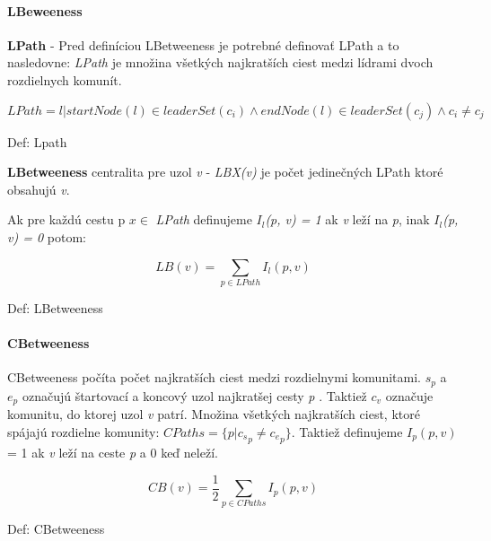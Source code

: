 \documentclass[slovak,master,public,dept460,male,cpdeclaration,oneside]{diploma}
\begin{document}
\paragraph{LBeweeness}
\hfill \break
\textbf{LPath} - Pred definíciou LBetweeness je potrebné definovať LPath a to nasledovne: \textit{LPath} je množina všetkých najkratších ciest medzi lídrami dvoch rozdielnych komunít. 


\begin{mycapequ}[!ht]
   \begin{equation*}
     LPath = { l|startNode(l) \in  leaderSet(c_{i})\wedge endNode(l) \in leaderSet(c_{j}) \wedge c_{i}\neq c_{j} }
   \end{equation*}
   \caption{Def: Lpath}
\end{mycapequ}



{\setlength{\parindent}{0cm}
\begin{sloppypar}
\textbf{LBetweeness} centralita pre uzol \textit{v} - \textit{LBX(v)} je počet jedinečných LPath ktoré obsahujú \textit{v}. 


Ak pre každú cestu p  ${x \in}$ \textit{LPath} definujeme \textit{${I_l}$(p, v) = 1} ak \textit{v} leží na \textit{p}, inak \textit{${I_l}$(p, v) = 0} potom:
\end{sloppypar}
}
 
\begin{mycapequ}[!ht]
   \begin{equation*}
     LB(v) = \sum_{p \in LPath} I_{l}(p, v)
   \end{equation*}
   \caption{Def: LBetweeness}
\end{mycapequ}


\paragraph{CBetweeness}
\hfill \break
CBetweeness počíta počet najkratších ciest medzi rozdielnymi komunitami. \textit{${s_p}$} a \textit{${e_p}$} označujú štartovací a koncový uzol najkratšej cesty \textit{p} . Taktiež \textit{${c_v}$} označuje komunitu, do ktorej uzol \textit{v} patrí. Množina všetkých najkratších ciest, ktoré spájajú rozdielne komunity:  
\textit{${CPaths = \{ p | {c_s}_p \neq {c_e}_p} \}$}. Taktiež definujeme ${I_p(p, v)}$ = 1 ak \textit{v} leží na ceste \textit{p} a 0 keď neleží.


\begin{mycapequ}[!ht]
   \begin{equation*}
    CB(v) = \frac{1}{2} \sum_{p \in CPaths} I_{p}(p, v)
   \end{equation*}
   \caption{Def: CBetweeness}
\end{mycapequ}
\end{document}
